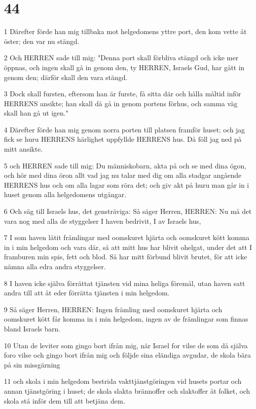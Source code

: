 \chapter{44}

\par 1 Därefter förde han mig tillbaka mot helgedomens yttre port, den kom vette åt öster; den var nu stängd.
\par 2 Och HERREN sade till mig: "Denna port skall förbliva stängd och icke mer öppnas, och ingen skall gå in genom den, ty HERREN, Israels Gud, har gått in genom den; därför skall den vara stängd.
\par 3 Dock skall fursten, eftersom han är furste, få sitta där och hålla måltid inför HERRENS ansikte; han skall då gå in genom portens förhus, och samma väg skall han gå ut igen."
\par 4 Därefter förde han mig genom norra porten till platsen framför huset; och jag fick se huru HERRENS härlighet uppfyllde HERRENS hus. Då föll jag ned på mitt ansikte.
\par 5 och HERREN sade till mig: Du människobarn, akta på och se med dina ögon, och hör med dina öron allt vad jag nu talar med dig om alla stadgar angående HERRENS hus och om alla lagar som röra det; och giv akt på huru man går in i huset genom alla helgedomens utgångar.
\par 6 Och säg till Israels hus, det gensträviga: Så säger Herren, HERREN: Nu må det vara nog med alla de styggelser I haven bedrivit, I av Israels hus,
\par 7 I som haven låtit främlingar med oomskuret hjärta och oomskuret kött komma in i min helgedom och vara där, så att mitt hus har blivit ohelgat, under det att I framburen min spis, fett och blod. Så har mitt förbund blivit brutet, för att icke nämna alla edra andra styggelser.
\par 8 I haven icke själva förrättat tjänsten vid mina heliga föremål, utan haven satt andra till att åt eder förrätta tjänsten i min helgedom.
\par 9 Så säger Herren, HERREN: Ingen främling med oomskuret hjärta och oomskuret kött får komma in i min helgedom, ingen av de främlingar som finnas bland Israels barn.
\par 10 Utan de leviter som gingo bort ifrån mig, när Israel for vilse de som då själva foro vilse och gingo bort ifrån mig och följde sina eländiga avgudar, de skola bära på sin missgärning
\par 11 och skola i min helgedom bestrida vakttjänstgöringen vid husets portar och annan tjänstgöring i huset; de skola slakta brännoffer och slaktoffer åt folket, och skola stå inför dem till att betjäna dem.
